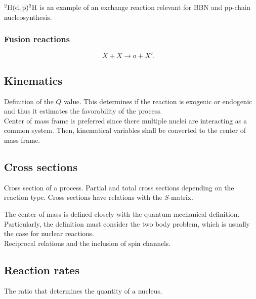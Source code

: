 \documentclass[openany]{book}
\begin{document}
$\mathrm{{}^{2}H(d, p){}^{3}H}$ is an example of an exchange reaction relevant for BBN and pp-chain nucleosynthesis. 


\subsubsection{Fusion reactions} \label{ssub:fusionReactions}

\begin{equation}  \label{eq:nuclearReaction_fusion}
	X + X \rightarrow a + X'.
\end{equation}

\subsection{Kinematics} \label{sub:kinematics}

Definition of the $Q$ value. This determines if the reaction is exogenic or endogenic and thus it estimates the favorability of the process. \\

Center of mass frame is preferred since there multiple nuclei are interacting as a common system. Then, kinematical variables shall be converted to the center of mass frame. \\

\subsection{Cross sections} \label{sub:crossSections}

Cross section of a process. 
Partial and total cross sections depending on the reaction type.
Cross sections have relations with the $S$-matrix.

The center of mass is defined closely with the quantum mechanical definition. Particularly, the definition must consider the two body problem, which is usually the case for nuclear reactions. \\

Reciprocal relations and the inclusion of spin channels. \\



\subsection{Reaction rates} \label{sub:reactionRates}

The ratio that determines the quantity of a nucleus.
\end{document}
